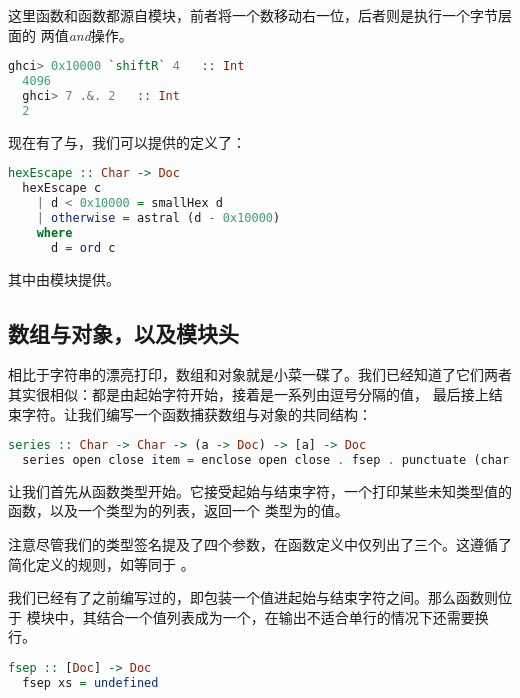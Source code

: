 \documentclass[./main.tex]{subfiles}
\begin{document}
这里函数和函数都源自模块，前者将一个数移动右一位，后者则是执行一个字节层面的
两值\textit{and}操作。

\begin{lstlisting}[language=Haskell]
  ghci> 0x10000 `shiftR` 4   :: Int
  4096
  ghci> 7 .&. 2   :: Int
  2
\end{lstlisting}

现在有了与，我们可以提供的定义了：

\begin{lstlisting}[language=Haskell]
  hexEscape :: Char -> Doc
  hexEscape c
    | d < 0x10000 = smallHex d
    | otherwise = astral (d - 0x10000)
    where
      d = ord c
\end{lstlisting}

其中由模块提供。

\subsection*{数组与对象，以及模块头}

相比于字符串的漂亮打印，数组和对象就是小菜一碟了。我们已经知道了它们两者其实很相似：都是由起始字符开始，接着是一系列由逗号分隔的值，
最后接上结束字符。让我们编写一个函数捕获数组与对象的共同结构：

\begin{lstlisting}[language=Haskell]
  series :: Char -> Char -> (a -> Doc) -> [a] -> Doc
  series open close item = enclose open close . fsep . punctuate (char ',') . map item
\end{lstlisting}

让我们首先从函数类型开始。它接受起始与结束字符，一个打印某些未知类型值的函数，以及一个类型为的列表，返回一个
类型为的值。

注意尽管我们的类型签名提及了四个参数，在函数定义中仅列出了三个。这遵循了简化定义的规则，如等同于
。

我们已经有了之前编写过的，即包装一个值进起始与结束字符之间。那么函数则位于
模块中，其结合一个值列表成为一个，在输出不适合单行的情况下还需要换行。

\begin{lstlisting}[language=Haskell]
  fsep :: [Doc] -> Doc
  fsep xs = undefined
\end{lstlisting}
\end{document}
